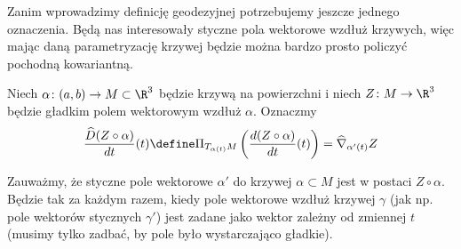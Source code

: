 Zanim wprowadzimy definicję geodezyjnej potrzebujemy jeszcze jednego oznaczenia. 
Będą nas interesowały styczne pola wektorowe wzdłuż krzywych, więc mając daną 
parametryzację krzywej będzie można bardzo prosto policzyć pochodną 
kowariantną. 
\begin{frame}


Niech $\alpha\colon (a,b)\to M\subset\R^3$ będzie krzywą na powierzchni i niech $Z\colon M\to \R^3$ będzie gładkim polem wektorowym wzdłuż $\alpha$. Oznaczmy 
\[\frac{\widehat{D}(Z\circ \alpha)}{dt}(t)\define\Pi_{T_{\alpha(t)}M}\left(\frac{d (Z\circ \alpha)}{dt}(t)\right)=\widehat{\nabla}_{\alpha'(t)}Z\]


\end{frame}
\begin{uwaga}
Zauważmy, że styczne pole wektorowe $\alpha'$ do krzywej $\alpha\subset M$ jest 
w postaci $Z\circ \alpha$. Będzie tak za każdym razem, kiedy pole wektorowe 
wzdłuż krzywej $\gamma$ (jak np. pole wektor\'ow stycznych $\gamma'$) jest 
zadane jako wektor zależny od zmiennej $t$ (musimy tylko zadbać, by pole było 
wystarczająco gładkie).
\end{uwaga}

